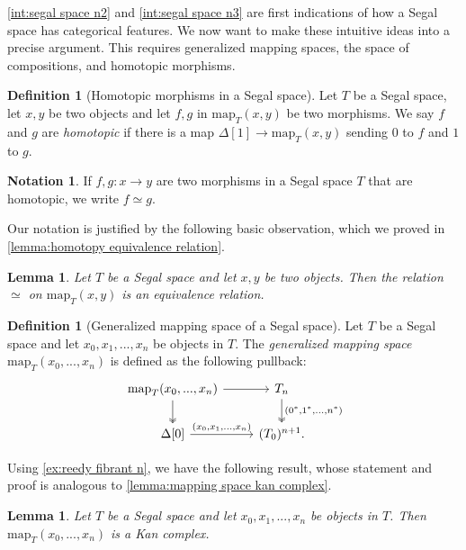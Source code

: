 \documentclass[11pt, a4paper]{amsart}
\newcommand{\map}{\mathrm{map}}
\newtheorem{lemma}[equation]{Lemma}
\theoremstyle{definition}
\newtheorem{definition}[equation]{Definition}
\newtheorem{notation}[equation]{Notation}
\theoremstyle{remark}
\numberwithin{equation}{section}
\begin{document}
\cref{int:segal space n2} and \cref{int:segal space n3} are first indications of how a Segal space has categorical features. We now want to make these intuitive ideas into a precise argument. This requires generalized mapping spaces, the space of compositions, and homotopic morphisms.

\begin{definition}[Homotopic morphisms in a Segal space] \label{def:homotopic morphisms}
 Let $T$ be a Segal space, let $x,y$ be two objects and let $f,g$ in $\map_T(x,y)$ be two morphisms. We say $f$ and $g$ are \emph{homotopic} if there is a map $\Delta[1] \to \map_T(x,y)$ sending $0$ to $f$ and $1$ to $g$. 
\end{definition}

\begin{notation}
  If $f,g\colon x \to y$ are two morphisms in a Segal space $T$ that are homotopic, we write $f \simeq g$.
\end{notation}

Our notation is justified by the following basic observation, which we proved in \cref{lemma:homotopy equivalence relation}.

\begin{lemma} \label{lemma:homotopy equivalence relation segal}
  Let $T$ be a Segal space and let $x,y$ be two objects. Then the relation $\simeq$ on $\map_T(x,y)$ is an equivalence relation.
\end{lemma}

\begin{definition}[Generalized mapping space of a Segal space] \label{def:space of compositions}
 Let $T$ be a Segal space and let $x_0,x_1, ..., x_n$ be objects in $T$. The \emph{generalized mapping space} $\map_{T}(x_0,...,x_n)$ is defined as the following pullback:
 \[ 
 \begin{tikzcd}
    \map_{T}(x_0,...,x_n) \arrow[r] \arrow[d, twoheadrightarrow] & T_n \arrow[d, "{(0^*,1^*,...,n^*)}", twoheadrightarrow] \\
    \Delta[0] \arrow[r, "{(x_0,x_1, ..., x_n)}"] & (T_0)^{n+1}.
 \end{tikzcd}
 \]
\end{definition}

Using \cref{ex:reedy fibrant n}, we have the following result, whose statement and proof is analogous to \cref{lemma:mapping space kan complex}.

\begin{lemma} \label{lemma:generalized mapping space kan complex}
  Let $T$ be a Segal space and let $x_0,x_1, ..., x_n$ be objects in $T$. Then $\map_T(x_0,...,x_n)$ is a Kan complex.
\end{lemma}
\end{document}
